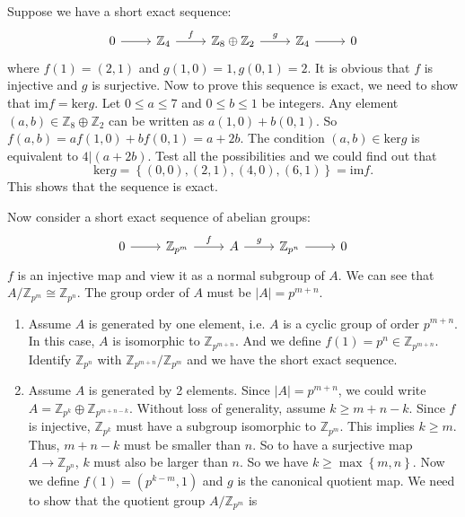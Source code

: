 \documentclass[a4paper, 11pt]{article}
\begin{document}
\begin{solution}
Suppose we have a short exact sequence:
$$\begin{tikzcd}
	0 & {\mathbb{Z}_4} & {\mathbb{Z}_8\oplus\mathbb{Z}_2} & {\mathbb{Z}_4} & 0
	\arrow[from=1-1, to=1-2]
	\arrow["f", from=1-2, to=1-3]
	\arrow["g", from=1-3, to=1-4]
	\arrow[from=1-4, to=1-5]
\end{tikzcd}$$
where \(f(1)=(2,1)\) and \(g(1,0)=1,g(0,1)=2\). It is obvious that \(f\) is injective and \(g\) is surjective. Now to prove this sequence is exact, we need to show that \(\text{im}f=\text{ker}g\). 
Let \(0\leq a\leq 7\) and \(0\leq b\leq 1\) be integers. Any element \((a,b)\in \mathbb{Z}_8\oplus \mathbb{Z}_2\) can be written as \(a(1,0)+b(0,1)\). So \(f(a,b)=af(1,0)+bf(0,1)=a+2b\). The condition 
\((a,b)\in \text{ker}g\) is equivalent to \(4|(a+2b)\). Test all the possibilities and we could find out that 
$$\text{ker}g=\left\{ (0,0),(2,1),(4,0),(6,1) \right\}=\text{im}f.$$
This shows that the sequence is exact.
\par 
Now consider a short exact sequence of abelian groups:
$$\begin{tikzcd}
	0 & {\mathbb{Z}_{p^m}} & A & {\mathbb{Z}_{p^n}} & 0
	\arrow[from=1-1, to=1-2]
	\arrow["f",from=1-2, to=1-3]
	\arrow["g",from=1-3, to=1-4]
	\arrow[from=1-4, to=1-5]
\end{tikzcd}$$
\(f\) is an injective map and view it as a normal subgroup of \(A\). We can see that \(A/\mathbb{Z}_{p^m}\cong \mathbb{Z}_{p^n}\). The group order of \(A\) must be \(|A|=p^{m+n}\).
\\ 
\begin{enumerate}
    \item Assume \(A\) is generated by one element, i.e. \(A\) is a cyclic group of order \(p^{m+n}\). In this case, \(A\) is isomorphic to \(\mathbb{Z}_{p^{m+n}}\). And we define 
          \(f(1)=p^n\in \mathbb{Z}_{p^{m+n}}\). Identify \(\mathbb{Z}_{p^n}\) with \(\mathbb{Z}_{p^{m+n}}/\mathbb{Z}_{p^m}\) and we have the short exact sequence. 
    \item Assume \(A\) is generated by 2 elements. Since \(|A|=p^{m+n}\), we could write \(A=\mathbb{Z}_{p^k}\oplus \mathbb{Z}_{p^{m+n-k}}\). Without loss of generality, assume \(k\geq m+n-k\). Since \(f\) is injective, 
          \(\mathbb{Z}_{p^k}\) must have a subgroup isomorphic to \(\mathbb{Z}_{p^m}\). This implies \(k\geq m\). Thus, \(m+n-k\) must be smaller than \(n\). So to have a surjective map \(A\rightarrow \mathbb{Z}_{p^n}\), \(k\) 
          must also be larger than \(n\). So we have \(k\geq \max\left\{ m,n \right\}\). Now we define \(f(1)=(p^{k-m},1)\) and \(g\) is the canonical quotient map. We need to show that the quotient group \(A/\mathbb{Z}_{p^m}\) is 

\end{enumerate}
\end{solution}
\end{document}
